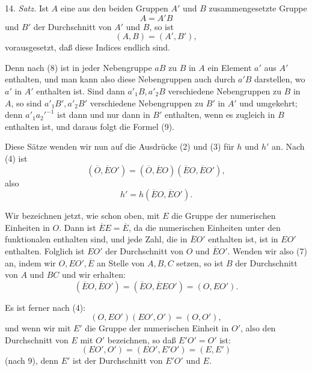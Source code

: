 \documentclass[11pt]{article}
\begin{document}
14. \emph{Satz.} Ist \(A\) eine aus den beiden Gruppen \(A'\) und \(B\) zusammengesetzte Gruppe
\begin{equation}
 A=A'B
\tag{8}
\end{equation}
und \(B'\) der Durchschnitt von \(A'\) und \(B\), so ist
\begin{equation}
 (A,B)=(A',B'),
\tag{9}
\end{equation}
vorausgesetzt, daß diese Indices endlich sind.

Denn nach (8) ist in jeder Nebengruppe \(aB\) zu \(B\) in \(A\) ein Element \(a'\) aus \(A'\) enthalten, und man kann also diese Nebengruppen auch durch \(a'B\) darstellen, wo \(a'\) in \(A'\) enthalten ist. Sind dann \(a'_1B,a'_2B\) verschiedene Nebengruppen zu \(B\) in \(A\), so sind \(a'_1B',a'_2B'\) verschiedene Nebengruppen zu \(B'\) in \(A'\) und umgekehrt; denn \(a'_1a_2'^{-1}\) ist dann und nur dann in \(B'\) enthalten, wenn es zugleich in \(B\) enthalten ist, und daraus folgt die Formel (9).

Diese Sätze wenden wir nun auf die Ausdrücke (2) und (3) für \(h\) und \(h'\) an. Nach (4) ist
\begin{equation}
 (\overline O,\overline EO')=(\overline O,\overline EO)(\overline EO,\overline EO'),
\tag{10}
\end{equation}
also
\begin{equation}
 h'=h(\overline EO,\overline EO').
\tag{11}
\end{equation}

Wir bezeichnen jetzt, wie schon oben, mit \(E\) die Gruppe der numerischen Einheiten in \(O\). Dann ist \(\overline EE=\overline E\), da die numerischen Einheiten unter den funktionalen enthalten sind, und jede Zahl, die in \(\overline EO'\) enthalten ist, ist in \(EO'\) enthalten. Folglich ist \(EO'\) der Durchschnitt von \(O\) und \(\overline EO'\). Wenden wir also (7) an, indem wir \(O,EO',\overline E\) an Stelle von \(A,B,C\) setzen, so ist \(B\) der Durchschnitt von \(A\) und \(BC\) und wir erhalten:
\begin{equation}
 (\overline EO,\overline EO')=(\overline EO,\overline EEO')=(O,EO').
\tag{12}
\end{equation}

Es ist ferner nach (4):
\begin{equation}
 (O,EO')(EO',O')=(O,O'),
\tag{13}
\end{equation}
und wenn wir mit \(E'\) die Gruppe der numerischen Einheit in \(O'\), also den Durchschnitt von \(E\) mit \(O'\) bezeichnen, so daß \(E'O'=O'\) ist:
\[
 (EO',O')=(EO',E'O')=(E,E')
\]
(nach 9), denn \(E'\) ist der Durchschnitt von \(E'O'\) und \(E\).
\end{document}
